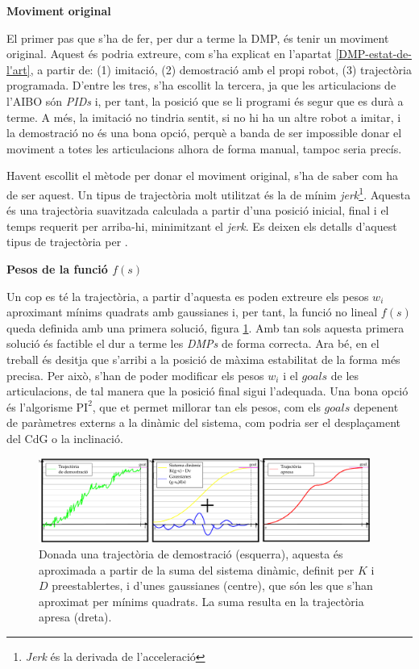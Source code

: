 \documentclass[12pt,a4paper,final,twoside]{article}
\begin{document}
\vspace{20pt}
\textbf{Moviment original}

El primer pas que s'ha de fer, per dur a terme la DMP, és tenir un moviment original. Aquest és podria extreure, com s'ha explicat en l'apartat \ref{DMP-estat-de-l'art}, a partir de: (1) imitació, (2) demostració amb el propi robot, (3) trajectòria programada. D'entre les tres, s'ha escollit la tercera, ja que les articulacions de l'AIBO són \textit{PIDs} i, per tant, la posició que se li programi és segur que es durà a terme. A més, la imitació no tindria sentit, si no hi ha un altre robot a imitar, i la demostració no és una bona opció, perquè a banda de ser impossible donar el moviment a totes les articulacions alhora de forma manual, tampoc seria precís.

Havent escollit el mètode per donar el moviment original, s'ha de saber com ha de ser aquest. Un tipus de trajectòria molt utilitzat és la de mínim \textit{jerk}\footnote{\textit{Jerk} és la derivada de l'acceleració}. Aquesta és una trajectòria suavitzada calculada a partir d'una posició inicial, final i el temps requerit per arriba-hi, minimitzant el \textit{jerk}. Es deixen els detalls d'aquest tipus de trajectòria per \cite{Shadmehr2004}.

\vspace{20pt}
\textbf{Pesos de la funció $f(s)$}

Un cop es té la trajectòria, a partir d'aquesta es poden extreure els pesos $w_i$ aproximant mínims quadrats amb gaussianes i, per tant, la funció no lineal $f(s)$ queda definida amb una primera solució, figura \ref{fig:LdF-trajectories}. Amb tan sols aquesta primera solució és factible el dur a terme les \textit{DMPs} de forma correcta. Ara bé, en el treball és desitja que s'arribi a la posició de màxima estabilitat de la forma més precisa. Per això, s'han de poder modificar els pesos $w_i$ i el $goals$ de les articulacions, de tal manera que la posició final sigui l'adequada. Una bona opció és l'algorisme $\mathrm{PI^2}$, que et permet millorar tan els pesos, com els $goals$ depenent de paràmetres externs a la dinàmic del sistema, com podria ser el desplaçament del CdG o la inclinació. 
\begin{figure}[tb]
\centering
\includegraphics[width=0.97\textwidth]{Imatges/Aprenentatge-per-demostracio.pdf}
\caption[\textit{DMP} a partir una trajectòria de demostració]{Donada una trajectòria de demostració (esquerra), aquesta és aproximada a partir de la suma del sistema dinàmic, definit per $K$ i $D$ preestablertes, i d'unes gaussianes (centre), que són les que s'han aproximat per mínims quadrats. La suma resulta en la trajectòria apresa (dreta).}
\label{fig:LdF-trajectories}
\end{figure}
\end{document}
